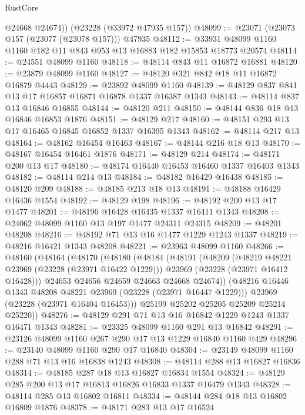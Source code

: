 \begin{lexlean}{RustCore}
\begin{coremodule}
        @24668
        @24674))
    (@23228 (@33972 @47935 @157))
@48099 := @23071 (@23073 @157 (@23077 (@23078 @157))) @47935
@48112 := @33931 @48099 @1160 @1160 @182 @11 @843 @953 @13 @16883 @182 @15853 @18773 @20574
@48114 := @24551 @48099 @1160
@48118 := @48114 @843 @11 @16872 @16881
@48120 := @23879 @48099 @1160
@48127 := @48120 @321 @842 @18 @11 @16872 @16879 @4443
@48129 := @23892 @48099 @1160
@48139 := @48129 @837 @841 @13 @17 @16857 @16871 @16878 @1337 @16387 @1343
@48143 := @48114 @837 @13 @16846 @16855
@48144 := @48120 @211
@48150 := @48144 @836 @18 @13 @16846 @16853 @1876
@48151 := @48129 @217
@48160 := @48151 @293 @13 @17 @16465 @16845 @16852 @1337 @16395 @1343
@48162 := @48114 @217 @13
@48164 := @48162 @16454 @16463
@48167 := @48144 @216 @18 @13
@48170 := @48167 @16454 @16461 @1876
@48171 := @48129 @214
@48174 := @48171 @200 @13 @17
@48180 := @48174 @16440 @16453 @16460 @1337 @16403 @1343
@48182 := @48114 @214 @13
@48184 := @48182 @16429 @16438
@48185 := @48120 @209
@48188 := @48185 @213 @18 @13
@48191 := @48188 @16429 @16436 @1554
@48192 := @48129 @198
@48196 := @48192 @200 @13 @17 @1477
@48201 := @48196 @16428 @16435 @1337 @16411 @1343
@48208 := @24062 @48099 @1160 @13 @197 @1477 @24311 @24315
@48209 := @48201 @48208
@48216 := @48192 @71 @13 @16 @1477 @1229 @1243 @1337
@48219 := @48216 @16421 @1343 @48208
@48221 := @23963 @48099 @1160
@48266 := @48160
    (@48164
      (@48170
        (@48180
          (@48184
            (@48191
              (@48209
                (@48219 @48221 @23969 (@23228 (@23971 @16422 @1229)))
                @23969
                (@23228 (@23971 @16412 @16428)))
              @24653
              @24656
              @24659
              @24663
              @24668
              @24674))
          (@48216 @16446 @1343 @48208 @48221 @23969 (@23228 (@23971 @16447 @1229)))
          @23969
          (@23228 (@23971 @16404 @16453)))
        @25199
        @25202
        @25205
        @25209
        @25214
        @25220))
@48276 := @48129 @291 @71 @13 @16 @16842 @1229 @1243 @1337 @16471 @1343
@48281 := @23325 @48099 @1160 @291 @13 @16842
@48291 := @23126 @48099 @1160 @267 @290 @17 @13 @1229 @16840 @1160 @429
@48296 := @23140 @48099 @1160 @290 @17 @16840
@48304 := @23149 @48099 @1160 @288 @71 @13 @16 @16838 @1243
@48308 := @48114 @288 @13 @16827 @16836
@48314 := @48185 @287 @18 @13 @16827 @16834 @1554
@48324 := @48129 @285 @200 @13 @17 @16813 @16826 @16833 @1337 @16479 @1343
@48328 := @48114 @285 @13 @16802 @16811
@48334 := @48144 @284 @18 @13 @16802 @16809 @1876
@48378 := @48171
    @283
    @13
    @17
    @16524

\end{coremodule}
\end{lexlean}
